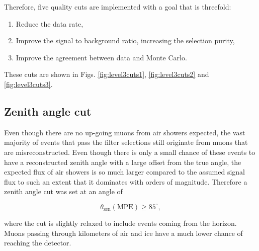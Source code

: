 Therefore, five quality cuts are implemented with a goal that is threefold:
\vspace{2mm}
\begin{enumerate}
\item Reduce the data rate,
\item Improve the signal to background ratio, increasing the selection purity,
\item Improve the agreement between data and Monte Carlo.
\end{enumerate}
\vspace{2mm}
\noindent These cuts are shown in Figs. \ref{fig:level3cuts1}, \ref{fig:level3cuts2} and \ref{fig:level3cuts3}.

\subsection{Zenith angle cut}
\label{subsec:zenithanglecut}
Even though there are no up-going muons from air showers expected, the vast majority of events that pass the filter selections still originate from muons that are misreconstructed. Even though there is only a small chance of these events to have a reconstructed zenith angle with a large offset from the true angle, the expected flux of air showers is so much larger compared to the assumed signal flux to such an extent that it dominates with orders of magnitude. Therefore a zenith angle cut was set at an angle of 

\begin{equation}
\theta_\textrm{zen} (\textrm{MPE}) \geq 85^\circ,
\end{equation}

\noindent where the cut is slightly relaxed to include events coming from the horizon. Muons passing through kilometers of air and ice have a much lower chance of reaching the detector.

